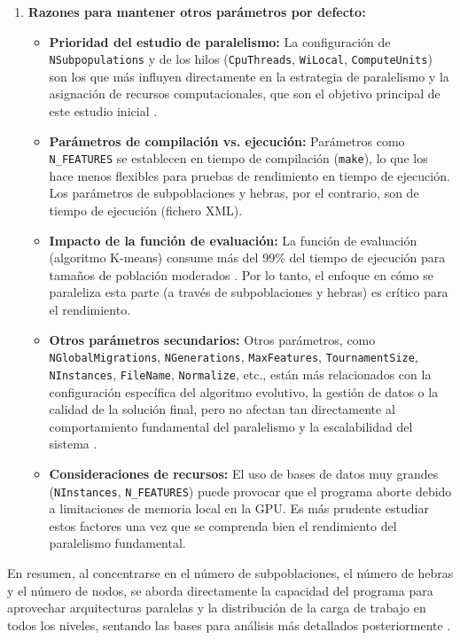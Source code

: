 \begin{enumerate}
    \item \textbf{Razones para mantener otros parámetros por defecto:}
          \begin{itemize}
              \item \textbf{Prioridad del estudio de paralelismo:} La configuración de \texttt{NSubpopulations} y de los hilos (\texttt{CpuThreads}, \texttt{WiLocal}, \texttt{ComputeUnits}) son los que más influyen directamente en la estrategia de paralelismo y la asignación de recursos computacionales, que son el objetivo principal de este estudio inicial \cite{escobar2020energy}.
              \item \textbf{Parámetros de compilación vs. ejecución:} Parámetros como \texttt{N\_FEATURES} se establecen en tiempo de compilación (\texttt{make}), lo que los hace menos flexibles para pruebas de rendimiento en tiempo de ejecución. Los parámetros de subpoblaciones y hebras, por el contrario, son de tiempo de ejecución (fichero XML).
              \item \textbf{Impacto de la función de evaluación:} La función de evaluación (algoritmo K-means) consume más del 99\% del tiempo de ejecución para tamaños de población moderados \cite{escobar2020energy}. Por lo tanto, el enfoque en cómo se paraleliza esta parte (a través de subpoblaciones y hebras) es crítico para el rendimiento.
              \item \textbf{Otros parámetros secundarios:} Otros parámetros, como \texttt{NGlobalMigrations}, \texttt{NGenerations}, \texttt{MaxFeatures}, \texttt{TournamentSize}, \texttt{NInstances}, \texttt{FileName}, \texttt{Normalize}, etc., están más relacionados con la configuración específica del algoritmo evolutivo, la gestión de datos o la calidad de la solución final, pero no afectan tan directamente al comportamiento fundamental del paralelismo y la escalabilidad del sistema \cite{escobar2020energy}.
              \item \textbf{Consideraciones de recursos:} El uso de bases de datos muy grandes (\texttt{NInstances}, \texttt{N\_FEATURES}) puede provocar que el programa aborte debido a limitaciones de memoria local en la GPU. Es más prudente estudiar estos factores una vez que se comprenda bien el rendimiento del paralelismo fundamental.
          \end{itemize}
\end{enumerate}

En resumen, al concentrarse en el número de subpoblaciones, el número de hebras y el número de nodos, se aborda directamente la capacidad del programa para aprovechar arquitecturas paralelas y la distribución de la carga de trabajo en todos los niveles, sentando las bases para análisis más detallados posteriormente \cite{escobar2020energy}.

